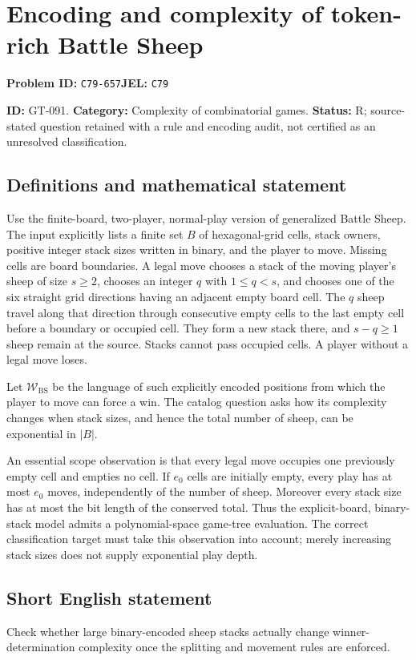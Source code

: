 \documentclass[11pt,a4paper]{article}
\begin{document}
\section*{Encoding and complexity of token-rich Battle Sheep}
\textbf{Problem ID:} \texttt{C79-657}\quad \textbf{JEL:} \texttt{C79}\par
\label{problem:OP-0221}
\label{game:GT-091}
{\sffamily\small\color{muted}
\noindent\textbf{ID:} GT-091. \textbf{Category:} Complexity of combinatorial games.
\textbf{Status:} R; source-stated question retained with a rule and encoding audit, not certified as an unresolved classification.
\par}
\subsection*{Definitions and mathematical statement}
Use the finite-board, two-player, normal-play version of generalized Battle Sheep. The input explicitly lists a finite set $B$ of hexagonal-grid cells, stack owners, positive integer stack sizes written in binary, and the player to move. Missing cells are board boundaries. A legal move chooses a stack of the moving player's sheep of size $s\geq2$, chooses an integer $q$ with $1\leq q<s$, and chooses one of the six straight grid directions having an adjacent empty board cell. The $q$ sheep travel along that direction through consecutive empty cells to the last empty cell before a boundary or occupied cell. They form a new stack there, and $s-q\geq1$ sheep remain at the source. Stacks cannot pass occupied cells. A player without a legal move loses.

Let $\mathcal W_{\mathrm{BS}}$ be the language of such explicitly encoded positions from which the player to move can force a win. The catalog question asks how its complexity changes when stack sizes, and hence the total number of sheep, can be exponential in $|B|$.

An essential scope observation is that every legal move occupies one previously empty cell and empties no cell. If $e_0$ cells are initially empty, every play has at most $e_0$ moves, independently of the number of sheep. Moreover every stack size has at most the bit length of the conserved total. Thus the explicit-board, binary-stack model admits a polynomial-space game-tree evaluation. The correct classification target must take this observation into account; merely increasing stack sizes does not supply exponential play depth.

\subsection*{Short English statement}
Check whether large binary-encoded sheep stacks actually change winner-determination complexity once the splitting and movement rules are enforced.
\end{document}
